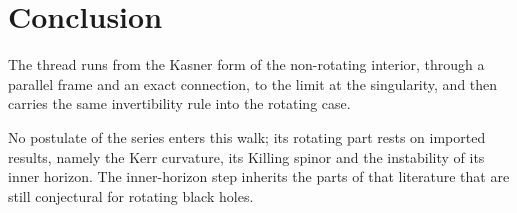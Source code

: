 \documentclass[11pt]{article}
\theoremstyle{definition}
\theoremstyle{plain}
\begin{document}
\section*{Conclusion}
The thread runs from the Kasner form of the non-rotating interior, through a parallel frame and an exact connection, to the limit at the singularity, and then carries the same invertibility rule into the rotating case.

No postulate of the series enters this walk; its rotating part rests on imported results, namely the Kerr curvature, its Killing spinor and the instability of its inner horizon. The inner-horizon step inherits the parts of that literature that are still conjectural for rotating black holes.
\end{document}

